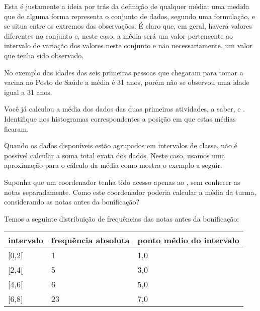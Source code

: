 Esta é justamente a ideia por trás da definição de qualquer média: uma medida que de alguma forma representa o conjunto de dados, segundo uma formulação, e se situa entre os extremos das observações. É claro que, em geral, haverá valores diferentes no conjunto e, neste caso, a média será um valor pertencente ao intervalo de variação dos valores neste conjunto e não necessariamente, um valor que tenha sido observado.

No exemplo das idades das seis primeiras pessoas que chegaram para tomar a vacina no Posto de Saúde a média é 31 anos, porém não se observou uma idade igual a 31 anos.

Você já calculou a média dos dados das duas primeiras atividades, a saber,  e . Identifique nos histogramas correspondentes a posição em que estas médias ficaram.


Quando os dados disponíveis estão agrupados em intervalos de classe,  não é possível calcular a soma total exata dos dados. Neste caso, usamos uma aproximação para o cálculo da média como mostra o exemplo a seguir.

Suponha que um coordenador tenha tido acesso apenas ao {\hyperref[\detokenize{PE104-0:fig-histograma-notas-sem-bonificacao}]{}}, sem conhecer as notas separadamente.  Como este coordenador poderia calcular a média da turma, considerando as notas antes da bonificação?

Temos a seguinte distribuição de frequências das notas antes da bonificação:


\begin{savenotes}\sphinxattablestart
\centering
{}
\label{\detokenize{PE104-1:id7}}
\sphinxaftercaption
\begin{tabulary}{\linewidth}[t]{|T|T|T|}
\hline

intervalo
&
frequência absoluta
&
ponto médio do intervalo
\\
\hline
{[}0,2{[}
&
1
&
1,0
\\
\hline
{[}2,4{[}
&
5
&
3,0
\\
\hline
{[}4,6{[}
&
6
&
5,0
\\
\hline
{[}6,8{]}
&
23
&
7,0
\\
\hline
\end{tabulary}
\par
\sphinxattableend\end{savenotes}

